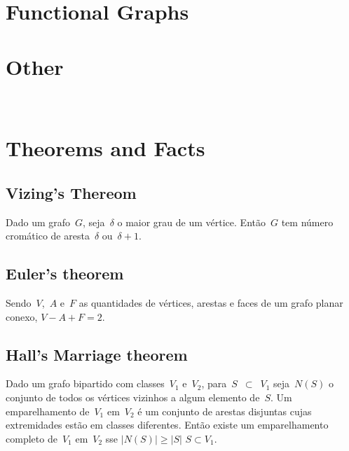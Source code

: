 \section{Functional Graphs}


\section{Other}
    \\

\section{Theorems and Facts}
\subsection{Vizing's Thereom}
Dado um grafo~$G$, seja~$\delta$ o maior grau de um vértice. Então~$G$ tem número cromático de aresta~$\delta$ ou~$\delta + 1$.

\subsection{Euler's theorem}
Sendo~$V$,~$A$ e~$F$ as quantidades de vértices, arestas e faces de um grafo planar conexo,
$V - A + F = 2$.
       
\subsection{Hall's Marriage theorem}
Dado um grafo bipartido com classes~$V_1$ e~$V_2$, para~$S$~$\subset$~$V_1$ seja~$N(S)$ o conjunto de todos os vértices vizinhos a algum elemento de~$S$. Um emparelhamento de~$V_1$ em~$V_2$ é um conjunto de arestas disjuntas cujas extremidades estão em classes diferentes. Então existe um emparelhamento completo de~$V_1$ em~$V_2$ sse $|N(S)| \geq |S|$ \forall $ S \subset V_1 $.
    
\iffalse %
\subsection{Maximum Density Subgraph}
Given (weighted) undirected graph $G$. Binary search density. If $g$ is
current density, construct flow network: $(S, u, m)$, $(u, T,
m+2g-d_u)$, $(u,v,1)$, where $m$ is a large constant (larger than sum
of edge weights). Run floating-point max-flow. If minimum cut has empty
$S$-component, then maximum density is smaller than $g$, otherwise it's
larger. Distance between valid densities is at least $1/(n(n-1))$. Edge
case when density is $0$. This also works for weighted graphs by
replacing $d_u$ by the weighted degree, and doing more iterations (if
weights are not integers).
\fi
